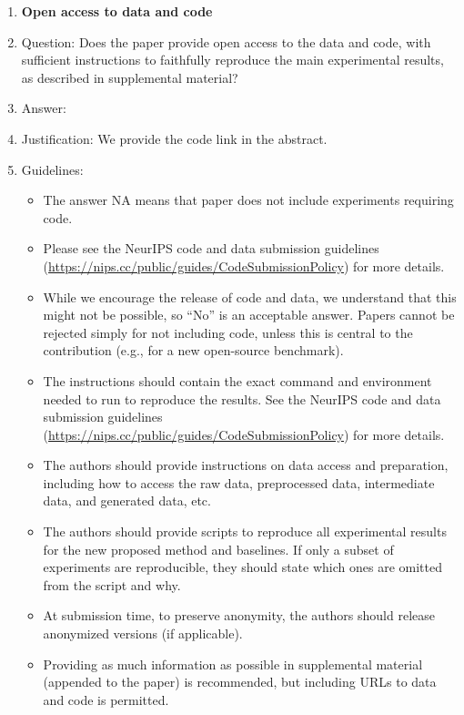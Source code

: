 \documentclass{article}
\begin{document}
\begin{enumerate}
\item {\bf Open access to data and code}
    \item[] Question: Does the paper provide open access to the data and code, with sufficient instructions to faithfully reproduce the main experimental results, as described in supplemental material?
    \item[] Answer: \answerYes{} %
    \item[] Justification: We provide the code link in the abstract.
    \item[] Guidelines:
    \begin{itemize}
        \item The answer NA means that paper does not include experiments requiring code.
        \item Please see the NeurIPS code and data submission guidelines (\url{https://nips.cc/public/guides/CodeSubmissionPolicy}) for more details.
        \item While we encourage the release of code and data, we understand that this might not be possible, so “No” is an acceptable answer. Papers cannot be rejected simply for not including code, unless this is central to the contribution (e.g., for a new open-source benchmark).
        \item The instructions should contain the exact command and environment needed to run to reproduce the results. See the NeurIPS code and data submission guidelines (\url{https://nips.cc/public/guides/CodeSubmissionPolicy}) for more details.
        \item The authors should provide instructions on data access and preparation, including how to access the raw data, preprocessed data, intermediate data, and generated data, etc.
        \item The authors should provide scripts to reproduce all experimental results for the new proposed method and baselines. If only a subset of experiments are reproducible, they should state which ones are omitted from the script and why.
        \item At submission time, to preserve anonymity, the authors should release anonymized versions (if applicable).
        \item Providing as much information as possible in supplemental material (appended to the paper) is recommended, but including URLs to data and code is permitted.
    \end{itemize}



\end{enumerate}
\end{document}

